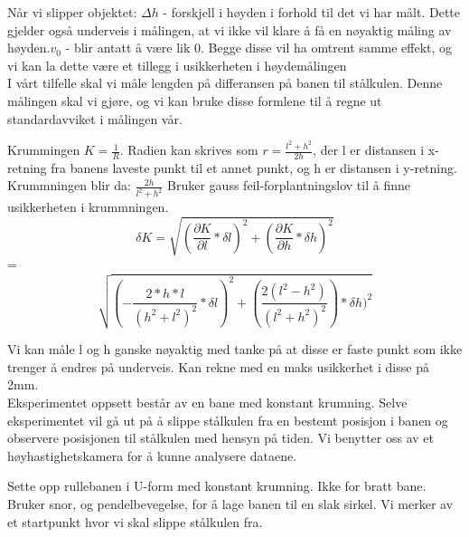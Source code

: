 Når vi slipper objektet: $\Delta h$ - forskjell i høyden i forhold til det vi har målt. Dette gjelder også underveis i målingen, at vi ikke vil klare å få en nøyaktig måling av høyden.$v_{0}$ - blir antatt å være lik 0. Begge disse vil ha omtrent samme effekt, og vi kan la dette være et tillegg i usikkerheten i høydemålingen\\


I vårt tilfelle skal vi måle lengden på differansen på banen til stålkulen. Denne målingen skal vi gjøre, og vi kan bruke disse formlene til å regne ut standardavviket i målingen vår.

Krummingen $K = \frac{1}{R}$. Radien kan skrives som $r = \frac{l^2 + h^2}{2h}$, der l er distansen i x-retning fra banens laveste punkt til et annet punkt, og h er distansen i y-retning. Krummningen blir da: $\frac{2h}{l^2+h^2} $ Bruker gauss feil-forplantningslov til å finne usikkerheten i krummningen.\\
$$\delta K = \sqrt{(\frac{\partial K}{\partial l}*\delta l)^2+ (\frac{\partial K}{\partial h}*\delta h)^2}$$ = $$\sqrt{(-\frac{2*h*l}{(h^2+l^2)^2}*\delta l)^2+ (\frac{2(l^2-h^2)}{(l^2+h^2)^2})*\delta h)^2}$$

Vi kan måle l og h ganske nøyaktig med tanke på at disse er faste punkt som ikke trenger å endres på underveis. Kan rekne med en maks usikkerhet i disse på 2mm.\\

Eksperimentet oppsett består av en bane med konstant krumning. Selve eksperimentet vil gå ut på å slippe stålkulen fra en bestemt posisjon i banen og observere posisjonen til stålkulen med hensyn på tiden. Vi benytter oss av et høyhastighetskamera for å kunne analysere dataene.\\


\item Sette opp rullebanen i U-form med konstant krumning. Ikke for bratt bane. Bruker snor, og pendelbevegelse, for å lage banen til en slak sirkel. Vi merker av et startpunkt hvor vi skal slippe stålkulen fra.
